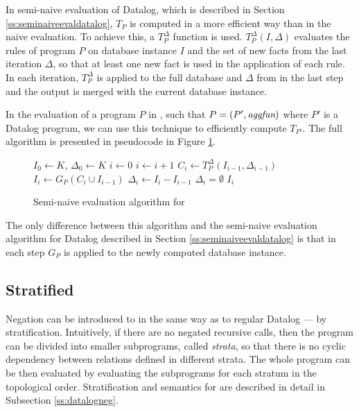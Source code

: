 In semi-naive evaluation of Datalog, which is described in Section \ref{ss:seminaiveevaldatalog}, $T_P$ is computed in a more efficient way than in the naive evaluation. To achieve this, a $T^\Delta_P$ function is used. $T_P^\Delta(I, \Delta)$ evaluates the rules of program $P$ on database instance $I$ and the set of new facts from the last iteration $\Delta$, so that at least one new fact is used in the application of each rule. In each iteration, $T^\Delta_P$ is applied to the full database and $\Delta$ from in the last step and the output is merged with the current database instance.

In the evaluation of a program $P$ in \datalogra, such that $P = (P', \textit{aggfun})$ where $P'$ is a Datalog program, we can use this technique to efficiently compute $T_{P'}$. The full algorithm is presented in pseudocode in Figure \ref{psc:seminaiveevaldatalogra}.

\begin{figure}[!htbp]
\begin{codebox}
  \li $I_0 \leftarrow K$, $\Delta_0 \leftarrow K$
  \li $i \leftarrow 0$
  \li \Repeat
	\li $i \leftarrow i + 1$
	\li $C_i \leftarrow T_P^\Delta(I_{i-1}, \Delta_{i-1})$
	\li $I_i \leftarrow G_P(C_i \cup I_{i-1})$
	\li $\Delta_i \leftarrow I_i - I_{i-1}$
  \li \Until $\Delta_i = \emptyset$
  \li \Return $I_i$
\end{codebox}
\caption{Semi-naive evaluation algorithm for \datalogra}\label{psc:seminaiveevaldatalogra}
\end{figure}


The only difference between this algorithm and the semi-naive evaluation algorithm for Datalog described in Section \ref{ss:seminaiveevaldatalog} is that in each step $G_P$ is applied to the newly computed database instance.

\subsection{Stratified \datalogra}
Negation can be introduced to \datalogra in the same way as to regular Datalog --- by stratification. Intuitively, if there are no negated recursive calls, then the program can be divided into smaller subprograms, called \emph{strata}, so that there is no cyclic dependency between relations defined in different strata. The whole program can be then evaluated by evaluating the subprograms for each stratum in the topological order. Stratification and semantics for \datalogneg are described in detail in Subsection \ref{ss:datalogneg}.

